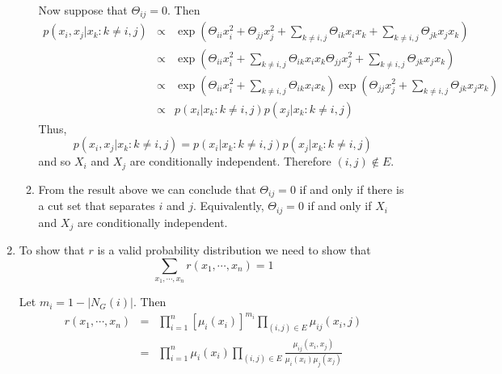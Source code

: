\documentclass{article}
\begin{document}
\begin{enumerate}
\begin{enumerate}
		Now suppose that $\Theta_{ij} = 0$. Then
		\begin{equation}
		\begin{aligned}
			p(x_i, x_j |x_k : k \not= i,j) & \propto & \exp(\Theta_{ii}x_i^2 + \Theta_{jj}x_j^2+ \sum_{k\not=i,j}\Theta_{ik}x_ix_k + \sum_{k\not=i,j}\Theta_{jk}x_jx_k) \\
			& \propto & \exp(\Theta_{ii}x_i^2 + \sum_{k\not=i,j}\Theta_{ik}x_ix_k\Theta_{jj}x_j^2 + \sum_{k\not=i,j}\Theta_{jk}x_jx_k) \\
			& \propto & \exp(\Theta_{ii}x_i^2 + \sum_{k\not=i,j}\Theta_{ik}x_ix_k)\exp(\Theta_{jj}x_j^2 + \sum_{k\not=i,j}\Theta_{jk}x_jx_k) \\
			& \propto & p(x_i |x_k : k \not= i,j)p(x_j |x_k : k \not= i,j) 
		\end{aligned}
		\end{equation}
		Thus,
		\begin{equation}
			p(x_i, x_j |x_k : k \not= i,j) =  p(x_i |x_k : k \not= i,j)p(x_j |x_k : k \not= i,j)
		\end{equation}	
		 and so $X_i$ and $X_j$ are conditionally independent. Therefore $(i, j) \not\in E$.

		\item From the result above we can conclude that $\Theta_{ij} = 0$ if and only if there is a cut set that separates $i$ and $j$. Equivalently, $\Theta_{ij} = 0$ if and only if $X_i$ and $X_j$ are conditionally independent. 

	\end{enumerate}


	\item To show that $r$ is a valid probability distribution we need to show that
	\begin{equation}
		\sum_{x_1,\cdots,x_n} r(x_1,\cdots,x_n) = 1
	\end{equation}

	Let $m_i = 1 - |N_G(i)|$. Then
	\begin{equation}
		\begin{aligned}
		r(x_1,\cdots,x_n) & = & \prod_{i = 1}^n [\mu_i(x_i)]^{m_i} \prod_{(i, j) \in E} \mu_{ij}(x_i, j) \\
		& = & \prod_{i = 1}^n \mu_i(x_i) \prod_{(i, j) \in E} \frac{\mu_{ij}(x_i, x_j)}{\mu_i(x_i)\mu_j(x_j)}
		\end{aligned}
	\end{equation}


\end{enumerate}
\end{document}
